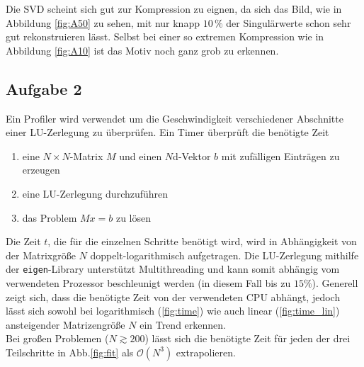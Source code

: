 \documentclass{scrartcl}
\begin{document}
        Die SVD scheint sich gut zur Kompression zu eignen, da sich das Bild, wie in Abbildung \ref{fig:A50} zu sehen, mit nur knapp
        $10 \, \%$ der Singulärwerte schon sehr gut rekonstruieren lässt. Selbst bei einer so extremen Kompression wie in Abbildung
        \ref{fig:A10} ist das Motiv noch ganz grob zu erkennen.
	
    \subsection*{Aufgabe 2}
    
		Ein Profiler wird verwendet um die Geschwindigkeit verschiedener Abschnitte einer LU-Zerlegung zu überprüfen.
		Ein Timer überprüft die benötigte Zeit
		\begin{enumerate}
		\item eine $N\times N$-Matrix $M$ und einen $N$d-Vektor $b$ mit zufälligen Einträgen zu erzeugen
		\item eine LU-Zerlegung durchzuführen
		\item das Problem $Mx = b$ zu lösen
		\end{enumerate}				
		Die Zeit $t$, die für die einzelnen Schritte benötigt wird, wird in Abhängigkeit von der Matrixgröße $N$ doppelt-logarithmisch aufgetragen. Die LU-Zerlegung mithilfe der \texttt{eigen}-Library unterstützt Multithreading und kann somit abhängig vom verwendeten Prozessor beschleunigt werden (in diesem Fall bis zu $15\%$). Generell zeigt sich, dass die benötigte Zeit von der verwendeten CPU abhängt, jedoch lässt sich sowohl bei logarithmisch (\ref{fig:time}) wie auch linear (\ref{fig:time_lin}) ansteigender Matrizengröße $N$ ein Trend erkennen.\\ Bei großen Problemen ($N\gtrsim 200$) lässt sich die benötigte Zeit für jeden der drei Teilschritte in Abb.\ref{fig:fit} als $\mathcal{O}(N^3)$ extrapolieren.
\end{document}
